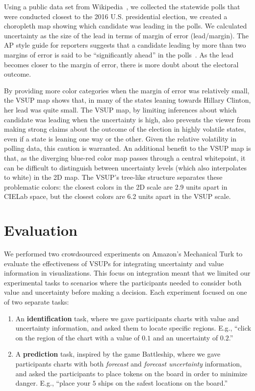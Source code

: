 \pollFig

Using a public data set from Wikipedia~\cite{wiki}, we collected the statewide polls that were conducted closest to the 2016 U.S. presidential election, we created a choropleth map showing which candidate was leading in the polls. We calculated uncertainty as the size of the lead in terms of margin of error (lead/margin). The AP style guide for reporters suggests that a candidate leading by more than two margins of error is said to be ``significantly ahead'' in the polls~\cite{french1988associated}. As the lead becomes closer to the margin of error, there is more doubt about the electoral outcome.

By providing more color categories when the margin of error was relatively small, the VSUP map shows that, in many of the states leaning towards Hillary Clinton, her lead was quite small. The VSUP map, by limiting inferences about which candidate was leading when the uncertainty is high, also prevents the viewer from making strong claims about the outcome of the election in highly volatile states, even if a state is leaning one way or the other. Given the relative volatility in polling data, this caution is warranted. An additional benefit to the VSUP map is that, as the diverging blue-red color map passes through a central whitepoint, it can be difficult to distinguish between uncertainty levels (which also interpolates to white) in the 2D map. The VSUP's tree-like structure separates these problematic colors: the closest colors in the 2D scale are 2.9 units apart in CIELab space, but the closest colors are 6.2 units apart in the VSUP scale.

\section{Evaluation}
\conditionFig

We performed two crowdsourced experiments on Amazon's Mechanical Turk to evaluate the effectiveness of VSUPs for integrating uncertainty and value information in visualizations. This focus on integration meant that we limited our experimental tasks to scenarios where the participants needed to consider both value and uncertainty before making a decision. Each experiment focused on one of two separate tasks:

\begin{enumerate}
	\item An \textbf{identification} task, where we gave participants charts with value and uncertainty information, and asked them to locate specific regions. E.g., ``click on the region of the chart with a value of $0.1$ and an uncertainty of $0.2$.''
	\item A \textbf{prediction} task, inspired by the game Battleship, where we gave participants charts with both \emph{forecast} and \emph{forecast uncertainty} information, and asked the participants to place tokens on the board in order to minimize danger. E.g., ``place your $5$ ships on the safest locations on the board.''
\end{enumerate}

